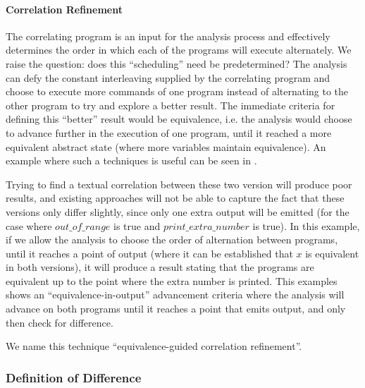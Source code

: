 \paragraph{Correlation Refinement} The correlating program is an input for the analysis process and effectively determines the order in which each of the programs will execute alternately. We raise the question: does this ``scheduling'' need be predetermined? The analysis can defy the constant interleaving supplied by the correlating program and choose to execute more commands of one program instead of alternating to the other program to try and explore a better result. The immediate criteria for defining this ``better'' result would be equivalence, i.e. the analysis would choose to advance further in the execution of one program, until it reached a more equivalent abstract state (where more variables maintain equivalence). An example where such a techniques is useful can be seen in .



Trying to find a textual correlation between these two version will produce poor results, and existing approaches will not be able to capture the fact that these versions only differ slightly, since only one extra output will be emitted (for the case where $out\_of\_range$ is true and $print\_extra\_number$ is true). In this example, if we allow the analysis to choose the order of alternation between programs, until it reaches a point of output (where it can be established that $x$ is equivalent in both versions), it will produce a result stating that the programs are equivalent up to the point where the extra number is printed. This examples shows an ``equivalence-in-output'' advancement criteria where the analysis will advance on both programs until it reaches a point that emits output, and only then check for difference.

We name this technique ``equivalence-guided correlation refinement''.

\subsubsection{Definition of Difference}

